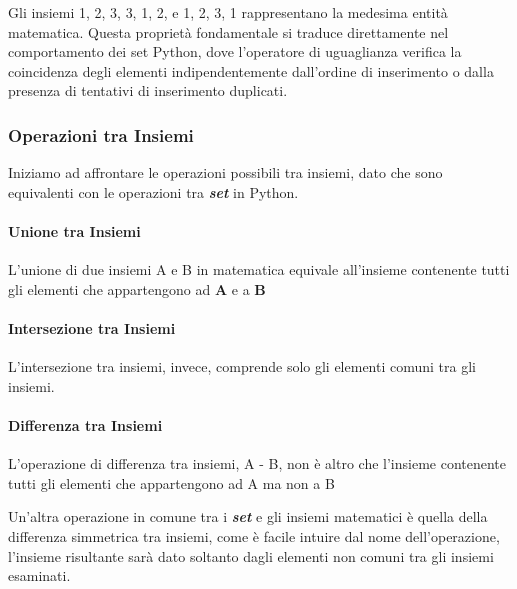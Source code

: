 Gli insiemi {1, 2, 3}, {3, 1, 2}, e {1, 2, 3, 1} rappresentano la medesima entità matematica.
Questa proprietà fondamentale si traduce direttamente nel comportamento dei set Python, dove l'operatore di uguaglianza verifica la coincidenza degli elementi indipendentemente dall'ordine di inserimento o dalla presenza di tentativi di inserimento duplicati.


\subsubsection{Operazioni tra Insiemi}\label{OperazioniTraInsiemi}

Iniziamo ad affrontare le operazioni possibili tra insiemi, dato che sono equivalenti con le operazioni tra \textit{\textbf{set}} in Python.

\paragraph{Unione tra Insiemi}
L'unione di due insiemi A e B in matematica equivale all'insieme contenente tutti gli elementi che appartengono ad \textbf{A} e a \textbf{B}




\paragraph{Intersezione tra Insiemi}
L'intersezione tra insiemi, invece, comprende solo gli elementi comuni tra gli insiemi.




\paragraph{Differenza tra Insiemi}

L'operazione di differenza tra insiemi, A - B, non è altro che l'insieme contenente tutti gli elementi che appartengono ad A ma non a B



Un'altra operazione in comune tra i \textit{\textbf{set}} e gli insiemi matematici è quella della differenza simmetrica tra insiemi, come è facile intuire dal nome dell'operazione, l'insieme risultante sarà dato soltanto dagli elementi non comuni tra gli insiemi esaminati.